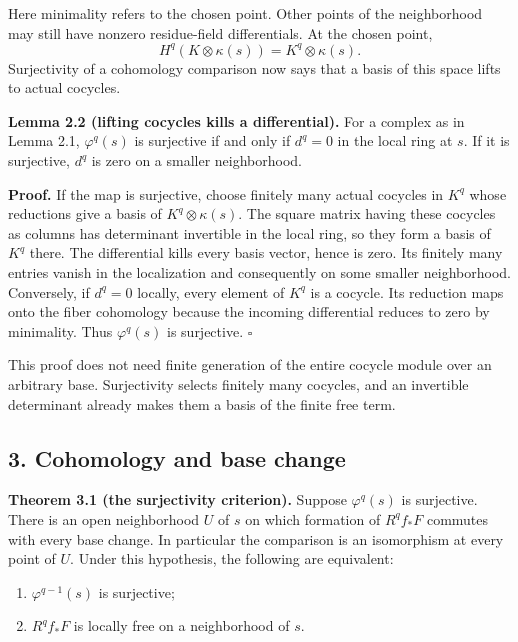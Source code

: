 \documentclass[11pt]{article}
\providecommand{\tightlist}{\setlength{\itemsep}{0pt}\setlength{\parskip}{0pt}}
\begin{document}
Here minimality refers to the chosen point. Other points of the
neighborhood may still have nonzero residue-field differentials. At the
chosen point, \[
H^q(K\otimes\kappa(s))=K^q\otimes\kappa(s).
\] Surjectivity of a cohomology comparison now says that a basis of this
space lifts to actual cocycles.

\textbf{Lemma 2.2 (lifting cocycles kills a differential).} For a
complex as in Lemma 2.1, \(\varphi^q(s)\) is surjective if and only if
\(d^q=0\) in the local ring at \(s\). If it is surjective, \(d^q\) is
zero on a smaller neighborhood.

\textbf{Proof.} If the map is surjective, choose finitely many actual
cocycles in \(K^q\) whose reductions give a basis of
\(K^q\otimes\kappa(s)\). The square matrix having these cocycles as
columns has determinant invertible in the local ring, so they form a
basis of \(K^q\) there. The differential kills every basis vector, hence
is zero. Its finitely many entries vanish in the localization and
consequently on some smaller neighborhood. Conversely, if \(d^q=0\)
locally, every element of \(K^q\) is a cocycle. Its reduction maps onto
the fiber cohomology because the incoming differential reduces to zero
by minimality. Thus \(\varphi^q(s)\) is surjective. \(\square\)

This proof does not need finite generation of the entire cocycle module
over an arbitrary base. Surjectivity selects finitely many cocycles, and
an invertible determinant already makes them a basis of the finite free
term.

\subsection{3. Cohomology and base
change}\label{cohomology-and-base-change}

\textbf{Theorem 3.1 (the surjectivity criterion).} Suppose
\(\varphi^q(s)\) is surjective. There is an open neighborhood \(U\) of
\(s\) on which formation of \(R^qf_*F\) commutes with every base change.
In particular the comparison is an isomorphism at every point of \(U\).
Under this hypothesis, the following are equivalent:

\begin{enumerate}
\def\labelenumi{\arabic{enumi}.}
\tightlist
\item
  \(\varphi^{q-1}(s)\) is surjective;
\item
  \(R^qf_*F\) is locally free on a neighborhood of \(s\).
\end{enumerate}
\end{document}
